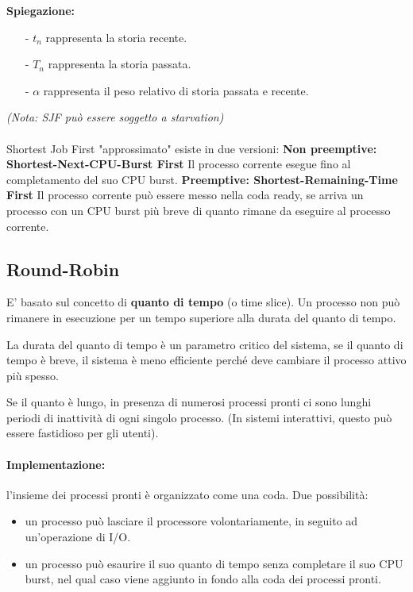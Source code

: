 \textbf{Spiegazione:} 
\begin{itemize}
    \item [-] $t_n$ rappresenta la storia recente.
    \item [-] $T_n$ rappresenta la storia passata.
    \item [-] $\alpha$ rappresenta il peso relativo di storia passata e recente.
\end{itemize}
\textit{(Nota: SJF può essere soggetto a starvation)}

\paragraph{}
Shortest Job First "approssimato" esiste in due versioni:
\newline
\textbf{Non preemptive: Shortest-Next-CPU-Burst First} 
Il processo corrente esegue fino al completamento del suo CPU burst.
\newline
\textbf{Preemptive: Shortest-Remaining-Time First} 
Il processo corrente può essere messo nella coda ready, se arriva un processo con un CPU burst più breve di quanto rimane da eseguire al processo corrente.

\subsection{Round-Robin}
E' basato sul concetto di \textbf{quanto di tempo} (o time slice). Un processo non può rimanere in esecuzione per un tempo superiore alla durata del quanto di tempo.

La durata del quanto di tempo è un parametro critico del sistema, se il quanto di tempo è breve, il sistema è meno efficiente perché deve cambiare il processo attivo più spesso.

Se il quanto è lungo, in presenza di numerosi processi pronti ci sono lunghi periodi di inattività di ogni singolo processo. (In sistemi interattivi, questo può essere fastidioso per gli   utenti).


\paragraph{Implementazione:} l'insieme dei processi pronti è organizzato come una coda.
Due possibilità:
\begin{itemize}
    \item un processo può lasciare il processore volontariamente, in seguito ad un'operazione di I/O.
    \item un processo può esaurire il suo quanto di tempo senza completare il suo CPU burst, nel qual caso viene aggiunto in fondo alla coda dei processi pronti.
\end{itemize}

